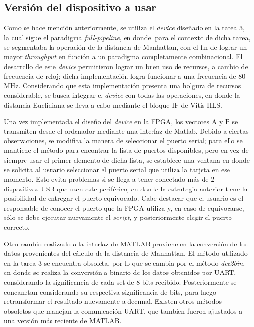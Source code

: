 \documentclass[conference]{IEEEtran}
\begin{document}
\subsection{Versión del dispositivo a usar}
    Como se hace mención anteriormente, se utiliza el \textit{device} diseñado en la tarea 3, la cual sigue el paradigma \textit{full-pipeline}, en donde, para el contexto de dicha tarea, se segmentaba la operación de la distancia de Manhattan, con el fin de lograr un mayor \textit{throughput} en función a un paradigma completamente combinacional. El desarrollo de este \textit{device} permitieron lograr un buen uso de recursos, a cambio de frecuencia de reloj; dicha implementación logra funcionar a una frecuencia de 80 MHz. Considerando que esta implementación presenta una holgura de recursos considerable, se busca integrar el \textit{device} con todas las operaciones, en donde la distancia Euclidiana se lleva a cabo mediante el bloque IP de Vitis HLS.
    
    Una vez implementada el diseño del \textit{device} en la FPGA, los vectores A y B se transmiten desde el ordenador mediante una interfaz de Matlab. Debido a ciertas observaciones, se modifica la manera de seleccionar el puerto serial; para ello se mantiene el método para encontrar la lista de puertos disponibles, pero en vez de siempre usar el primer elemento de dicha lista, se establece una ventana en donde se solicita al usuario seleccionar el puerto serial que utiliza la tarjeta en ese momento. Esto evita problemas si se llega a tener conectado más de 2 dispositivos USB que usen este periférico, en donde la estrategia anterior tiene la posibilidad de entregar el puerto equivocado. Cabe destacar que el usuario es el responsable de conocer el puerto que la FPGA utiliza y, en caso de equivocarse, sólo se debe ejecutar nuevamente el \textit{script}, y posteriormente elegir el puerto correcto.\par
    
    Otro cambio realizado a la interfaz de MATLAB proviene en la conversión de los datos provenientes del cálculo de la distancia de Manhattan. El método utilizado en la tarea 3 se encuentra obsoleta, por lo que se cambia por el método \textit{dec2bin}, en donde se realiza la conversión a binario de los datos obtenidos por UART, considerando la significancia de cada set de 8 bits recibido. Posteriormente se concanetan considerando su respectiva significancia de bits, para luego retransformar el resultado nuevamente a decimal. Existen otros métodos obsoletos que manejan la comunicación UART, que tambien fueron ajustados a una versión más reciente de MATLAB.
    
\end{document}
